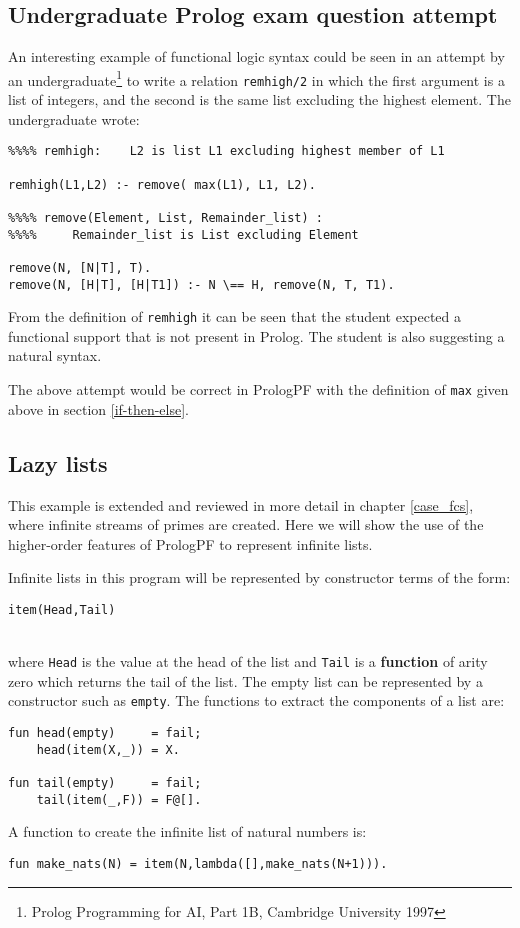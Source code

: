 \subsection{Undergraduate Prolog exam question attempt}

An interesting example of functional logic syntax could be seen in an
attempt by an undergraduate\footnote{Prolog Programming for AI, Part 1B,
Cambridge University 1997} to write a relation \texttt{remhigh/2} in which
the first argument is a list of integers, and the second is the same list
excluding the highest element.  The undergraduate wrote:
\begin{verbatim}
%%%% remhigh:    L2 is list L1 excluding highest member of L1

remhigh(L1,L2) :- remove( max(L1), L1, L2).

%%%% remove(Element, List, Remainder_list) :
%%%%     Remainder_list is List excluding Element

remove(N, [N|T], T).
remove(N, [H|T], [H|T1]) :- N \== H, remove(N, T, T1).
\end{verbatim}
From the definition of \texttt{remhigh} it can be seen that the student
expected a functional support that is not present in Prolog.  The student
is also suggesting a natural syntax.

The above attempt would be correct in PrologPF with the
definition of \texttt{max} given above in section \ref{if-then-else}.

\subsection{Lazy lists}

This example is extended and reviewed in more detail in
chapter \ref{case_fcs}, where infinite streams of primes are
created.  Here we will show the use of the higher-order features of 
PrologPF to represent infinite lists.

Infinite lists in this program will be represented by constructor
terms of the form:\\
\centerline{\texttt{item(Head,Tail)}}\\
where \texttt{Head} is the value at the head of the list and \texttt{Tail}
is a \textbf{function} of arity zero which returns the tail of the list.  The empty
list can be represented by a constructor such as \texttt{empty}.
The functions to extract the components of a list are:
\begin{verbatim}
fun head(empty)     = fail;
    head(item(X,_)) = X.

fun tail(empty)     = fail;
    tail(item(_,F)) = F@[].
\end{verbatim}
A function to create the infinite list of natural numbers is:\\
\centerline{\texttt{fun make\_{}nats(N) = item(N,lambda([],make\_{}nats(N+1))).}}

